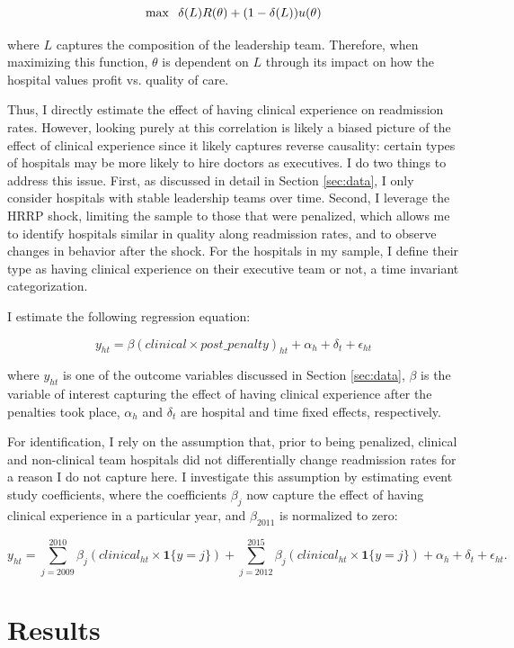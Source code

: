 \documentclass[12pt]{article}
\begin{document}
    $$\max\hspace{2mm} \delta(L) R(\theta) + (1-\delta(L)) u(\theta)$$

    \noindent where $L$ captures the composition of the leadership team. Therefore, when maximizing this function, $\theta$ is dependent on $L$ through its impact on how the hospital values profit vs. quality of care.

    Thus, I directly estimate the effect of having clinical experience on readmission rates. However, looking purely at this correlation is likely a biased picture of the effect of clinical experience since it likely captures reverse causality: certain types of hospitals may be more likely to hire doctors as executives. I do two things to address this issue. First, as discussed in detail in Section \ref{sec:data}, I only consider hospitals with stable leadership teams over time. Second, I leverage the HRRP shock, limiting the sample to those that were penalized, which allows me to identify hospitals similar in quality along readmission rates, and to observe changes in behavior after the shock. For the hospitals in my sample, I define their type as having clinical experience on their executive team or not, a time invariant categorization. 

    I estimate the following regression equation:

    $$y_{ht} = \beta (clinical \times post\_penalty)_{ht} + \alpha_{h} + \delta_t + \epsilon_{ht}$$

    \noindent where $y_{ht}$ is one of the outcome variables discussed in Section \ref{sec:data}, $\beta$ is the variable of interest capturing the effect of having clinical experience after the penalties took place, $\alpha_h$ and $\delta_t$ are hospital and time fixed effects, respectively. 

    For identification, I rely on the assumption that, prior to being penalized, clinical and non-clinical team hospitals did not differentially change readmission rates for a reason I do not capture here. I investigate this assumption by estimating event study coefficients, where the coefficients $\beta_j$ now capture the effect of having clinical experience in a particular year, and $\beta_{2011}$ is normalized to zero:

    $$y_{ht} = \sum_{j=2009}^{2010}\beta_j(clinical_{ht} \times \mathbf{1}\{y=j\}) + \sum_{j=2012}^{2015}\beta_j (clinical_{ht} \times \mathbf{1}\{y=j\}) + \alpha_{h} + \delta_t + \epsilon_{ht}.$$


    \section{Results}
\end{document}
